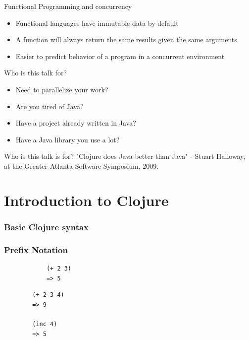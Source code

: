 \documentclass[xcolor=dvipsnames]{beamer}
\begin{document}
	\begin{frame}{Functional Programming and concurrency}
		\begin{itemize}
		\item Functional languages have immutable data by default
		\item A function will always return the same results given the same arguments
		\item Easier to predict behavior of a program in a concurrent environment
		\end{itemize}
	\end{frame}
	
	\begin{frame}{Who is this talk for?}
			\begin{itemize}
				\item Need to parallelize your work?
				\item Are you tired of Java?
		\pause
				\item Have a project already written in Java?
				\item Have a Java library you use a lot?
			\end{itemize}
	\end{frame}
	
	\begin{frame}{Who is this talk is for?}
	"Clojure does Java better than Java" - Stuart Halloway, at the Greater Atlanta Software Symposium, 2009.
	\end{frame}
		
	\begin{frame}
		\tableofcontents
	\end{frame}
	
	\section{Introduction to Clojure}
		\subsubsection{Basic Clojure syntax}
		\begin{frame}[fragile]
		\frametitle{Prefix Notation}
		\begin{verbatim}
			(+ 2 3)
			=> 5
		\end{verbatim}
		\pause
		\begin{verbatim}
		(+ 2 3 4)
		=> 9

		(inc 4)
		=> 5
		\end{verbatim}
		\end{frame}
\end{document}
